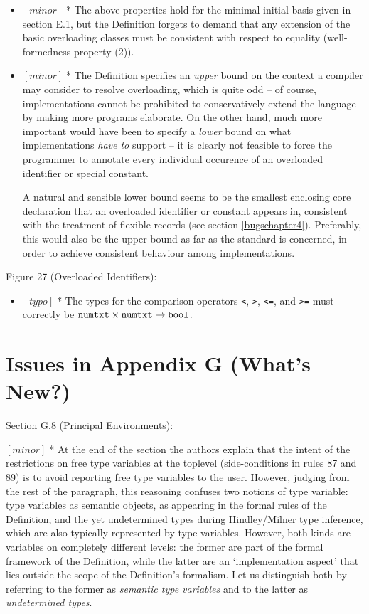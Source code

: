 \documentclass{article}
\newcommand{\m}[1]{$[\mathit{#1}]\;$}
\newcommand{\minor}{\m{minor}}
\newcommand{\typo}{\m{typo}}
\begin{document}
\begin{itemize}
\item \minor * The above properties hold for the minimal initial basis given in section E.1, but the Definition forgets to demand that any extension of the basic overloading classes must be consistent with respect to equality (well-formedness property (2)).

\item \minor * The Definition specifies an {\em upper} bound on the context a compiler may consider to resolve overloading, which is quite odd -- of course, implementations cannot be prohibited to conservatively extend the language by making more programs elaborate. On the other hand, much more important would have been to specify a {\em lower} bound on what implementations {\em have to} support -- it is clearly not feasible to force the programmer to annotate every individual occurence of an overloaded identifier or special constant.

A natural and sensible lower bound seems to be the smallest enclosing core declaration that an overloaded identifier or constant appears in, consistent with the treatment of flexible records (see section \ref{bugschapter4}). Preferably, this would also be the upper bound as far as the standard is concerned, in order to achieve consistent behaviour among implementations.
\end{itemize}


Figure 27 (Overloaded Identifiers):
\nopagebreak

\begin{itemize}
\item \typo * The types for the comparison operators {\tt<}, {\tt>}, {\tt<=}, and {\tt>=} must correctly be ${\tt numtxt} \times {\tt numtxt} \to {\tt bool}$.
\end{itemize}


\section{Issues in Appendix G (What's New?)}
\label{bugsappendixg}

Section G.8 (Principal Environments):
\nopagebreak

\minor * At the end of the section the authors explain that the intent of the restrictions on free type variables at the toplevel (side-conditions in rules 87 and 89) is to avoid reporting free type variables to the user. However, judging from the rest of the paragraph, this reasoning confuses two notions of type variable: type variables as semantic objects, as appearing in the formal rules of the Definition, and the yet undetermined types during Hindley/Milner type inference, which are also typically represented by type variables. However, both kinds are variables on completely different levels: the former are part of the formal framework of the Definition, while the latter are an `implementation aspect' that lies outside the scope of the Definition's formalism. Let us distinguish both by referring to the former as {\em semantic type variables} and to the latter as {\em undetermined types}.
\end{document}
